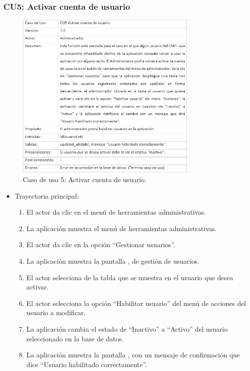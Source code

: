 		\subsubsection{CU5: Activar cuenta de usuario}
			\begin{figure}[htbp!]
				\centering
					\includegraphics[width=0.8\textwidth]{images/CU/CU5}
					\caption{Caso de uso 5: Activar cuenta de usuario.}
				\label{Tabla}
			\end{figure}
			
			\begin{itemize}
				\item Trayectoria principal:
					\begin{enumerate}
						\item El actor da clic en el menú de herramientas administrativas.
						\item La aplicación muestra el menú de herramientas administrativas.
						\item El actor da clic en la opción ``Gestionar usuarios''.
						\item La aplicación muestra la pantalla , de gestión de usuarios.
						\item El actor selecciona de la tabla que se muestra en  el usuario que desea activar.
						\item El actor selecciona la opción ``Habilitar usuario'' del menú de acciones del usuario a modificar.
						\item La aplicación cambia el estado de ``Inactivo'' a ``Activo'' del usuario seleccionado en la base de datos.
						\item La aplicación muestra la pantalla , con un mensaje de confirmación que dice ``Usuario habilitado correctamente''.
					\end{enumerate}
			\end{itemize}
			
